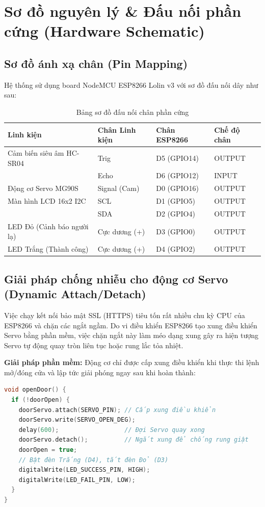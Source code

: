 \documentclass[12pt,a4paper]{article}
\begin{document}
\section{Sơ đồ nguyên lý \& Đấu nối phần cứng (Hardware Schematic)}

\subsection{Sơ đồ ánh xạ chân (Pin Mapping)}
Hệ thống sử dụng board NodeMCU ESP8266 Lolin v3 với sơ đồ đấu nối dây như sau:

\begin{table}[h]
\centering
\begin{tabular}{@{}llll@{}}
\toprule
\textbf{Linh kiện} & \textbf{Chân Linh kiện} & \textbf{Chân ESP8266} & \textbf{Chế độ chân} \\ \midrule
Cảm biến siêu âm HC-SR04 & Trig & D5 (GPIO14) & OUTPUT \\
                         & Echo & D6 (GPIO12) & INPUT \\
Động cơ Servo MG90S      & Signal (Cam) & D0 (GPIO16) & OUTPUT \\
Màn hình LCD 16x2 I2C    & SCL & D1 (GPIO5) & OUTPUT \\
                         & SDA & D2 (GPIO4) & OUTPUT \\
LED Đỏ (Cảnh báo người lạ) & Cực dương (+) & D3 (GPIO0) & OUTPUT \\
LED Trắng (Thành công)   & Cực dương (+) & D4 (GPIO2) & OUTPUT \\
\bottomrule
\end{tabular}
\caption{Bảng sơ đồ đấu nối chân phần cứng}
\end{table}

\subsection{Giải pháp chống nhiễu cho động cơ Servo (Dynamic Attach/Detach)}
Việc chạy kết nối bảo mật SSL (HTTPS) tiêu tốn rất nhiều chu kỳ CPU của ESP8266 và chặn các ngắt ngầm. Do vi điều khiển ESP8266 tạo xung điều khiển Servo bằng phần mềm, việc chặn ngắt này làm méo dạng xung gây ra hiện tượng Servo tự động quay tròn liên tục hoặc rung lắc tỏa nhiệt.

\textbf{Giải pháp phần mềm:} Động cơ chỉ được cấp xung điều khiển khi thực thi lệnh mở/đóng cửa và lập tức giải phóng ngay sau khi hoàn thành:
\begin{lstlisting}[language=C++]
void openDoor() {
  if (!doorOpen) {
    doorServo.attach(SERVO_PIN); // Cấp xung điều khiển
    doorServo.write(SERVO_OPEN_DEG);
    delay(600);                  // Đợi Servo quay xong
    doorServo.detach();          // Ngắt xung để chống rung giật
    doorOpen = true;
    // Bật đèn Trắng (D4), tắt đèn Đỏ (D3)
    digitalWrite(LED_SUCCESS_PIN, HIGH);
    digitalWrite(LED_FAIL_PIN, LOW);
  }
}
\end{lstlisting}
\end{document}

